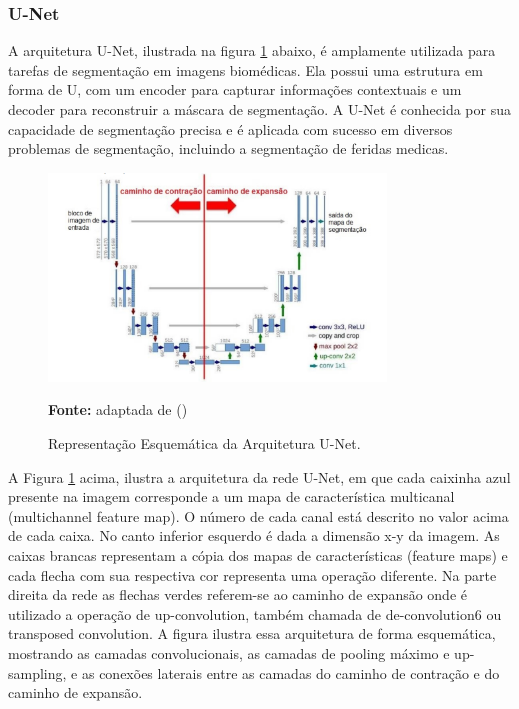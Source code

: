     
    \subsubsection{U-Net}

        A arquitetura \ac{U-Net}, ilustrada na figura \ref{fig:arquiteturaUNet} abaixo,  é amplamente utilizada para tarefas de segmentação em imagens biomédicas. Ela possui uma estrutura em forma de U, com um encoder para capturar informações contextuais e um decoder para reconstruir a máscara de segmentação. A \ac{U-Net} é conhecida por sua capacidade de segmentação precisa e é aplicada com sucesso em diversos problemas de segmentação, incluindo a segmentação de feridas medicas.

        \clearpage

        \begin{figure}[htbp]
            \centering
             \caption{Representação Esquemática da Arquitetura \ac{U-Net}. }
            \includegraphics[width=0.8\textwidth]{img/arquitetura_U-Net.png}
            \label{fig:arquiteturaUNet}
            \par\medskip\textbf{Fonte:} adaptada de (\cite{ronneberger2015u})
        \end{figure}

            A Figura \ref{fig:arquiteturaUNet} acima, ilustra a arquitetura da rede \ac{U-Net}, em que cada caixinha azul presente na imagem corresponde a um mapa de característica multicanal (multichannel feature map). O número de cada canal está descrito no valor acima de cada caixa. No canto inferior esquerdo é dada a dimensão x-y da imagem. As caixas brancas representam a cópia dos mapas de características (feature maps) e cada flecha com sua respectiva cor representa uma operação diferente. Na parte direita da rede as flechas verdes referem-se ao caminho de expansão onde é utilizado a operação de up-convolution, também chamada de de-convolution6 ou transposed convolution. A figura ilustra essa arquitetura de forma esquemática, mostrando as camadas convolucionais, as camadas de pooling máximo e up-sampling, e as conexões laterais entre as camadas do caminho de contração e do caminho de expansão.


